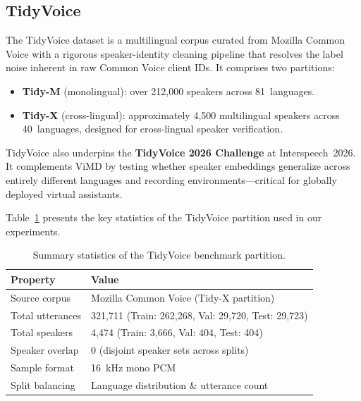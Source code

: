 
\subsection{TidyVoice}

The TidyVoice dataset \cite{farhadipour2026tidyvoice} is a multilingual corpus curated from Mozilla Common Voice with a rigorous speaker-identity cleaning pipeline that resolves the label noise inherent in raw Common Voice client IDs. It comprises two partitions:

\begin{itemize}
    \item \textbf{Tidy-M} (monolingual): over 212{,}000 speakers across 81~languages.
    \item \textbf{Tidy-X} (cross-lingual): approximately 4{,}500 multilingual speakers across 40~languages, designed for cross-lingual speaker verification.
\end{itemize}

TidyVoice also underpins the \textbf{TidyVoice 2026 Challenge} at Interspeech~2026. It complements ViMD by testing whether speaker embeddings generalize across entirely different languages and recording environments---critical for globally deployed virtual assistants.

Table~\ref{tab:tidyvoice-stats} presents the key statistics of the TidyVoice partition used in our experiments.

\begin{table}[H]
\centering
\begin{tabular}{ll}
\toprule
\textbf{Property} & \textbf{Value} \\
\midrule
Source corpus                & Mozilla Common Voice (Tidy-X partition) \\
Total utterances             & 321{,}711 (Train: 262{,}268, Val: 29{,}720, Test: 29{,}723) \\
Total speakers               & 4{,}474 (Train: 3{,}666, Val: 404, Test: 404) \\
Speaker overlap              & 0 (disjoint speaker sets across splits) \\
Sample format                & 16~kHz mono PCM \\
Split balancing              & Language distribution \& utterance count \\
\bottomrule
\end{tabular}
\caption{Summary statistics of the TidyVoice benchmark partition.}
\label{tab:tidyvoice-stats}
\end{table}


